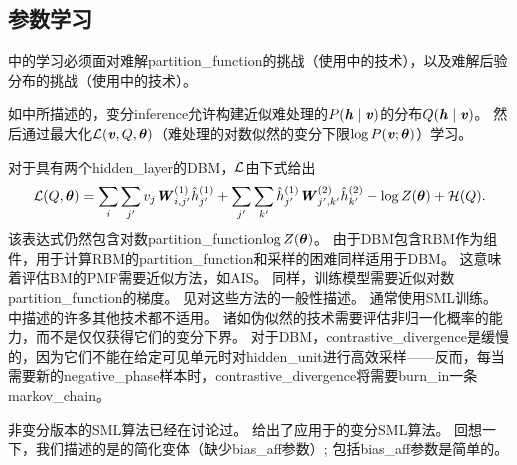 \subsection{参数学习}
\label{sec:dbm_parameter_learning}

中的学习必须面对难解\gls{partition_function}的挑战（使用中的技术），以及难解后验分布的挑战（使用中的技术）。

如中所描述的，变分\gls{inference}允许构建近似难处理的$P(\boldsymbol{\mathit{h}}  \mid  \boldsymbol{\mathit{v}})$的分布$Q(\boldsymbol{\mathit{h}} \mid \boldsymbol{\mathit{v}})$。
然后通过最大化$\mathcal{L}(\boldsymbol{\mathit{v}}, Q, \boldsymbol{\theta})$（难处理的对数似然的变分下限$\log P(\boldsymbol{\mathit{v}}; \boldsymbol{\theta})$）学习。


对于具有两个\gls{hidden_layer}的\gls{DBM}，$\mathcal{L}$由下式给出
\begin{align}
 \mathcal{L}(Q, \boldsymbol{\theta}) = \sum_i \sum_{j^{\prime}} v_j \boldsymbol{\mathit{W}}_{i,j^{\prime}}^{(1)} 
 \hat h_{j^{\prime}}^{(1)} +  \sum_{j^{\prime}} \sum_{k^{\prime}} \hat h_{j^{\prime}}^{(1)}
 \boldsymbol{\mathit{W}}_{j^{\prime}, k^{\prime}}^{(2)} \hat h_{k^{\prime}}^{(2)} - \log Z(\boldsymbol{\theta}) + \mathcal{H}(Q).
\end{align}
该表达式仍然包含对数\gls{partition_function}$ \log Z(\boldsymbol{\theta}) $。
由于\gls{DBM}包含\gls{RBM}作为组件，用于计算\gls{RBM}的\gls{partition_function}和采样的困难同样适用于\gls{DBM}。
这意味着评估\gls{BM}的\gls{PMF}需要近似方法，如\gls{AIS}。
同样，训练模型需要近似对数\gls{partition_function}的梯度。
见对这些方法的一般性描述。
通常使用\gls{SML}训练。
中描述的许多其他技术都不适用。
诸如伪似然的技术需要评估非归一化概率的能力，而不是仅仅获得它们的变分下界。
对于\gls{DBM}，\gls{contrastive_divergence}是缓慢的，因为它们不能在给定可见单元时对\gls{hidden_unit}进行高效采样——反而，每当需要新的\gls{negative_phase}样本时，\gls{contrastive_divergence}将需要\gls{burn_in}一条\gls{markov_chain}。


非变分版本的\gls{SML}算法已经在讨论过。
给出了应用于的变分\gls{SML}算法。
回想一下，我们描述的是的简化变体（缺少\gls{bias_aff}参数）; 包括\gls{bias_aff}参数是简单的。

